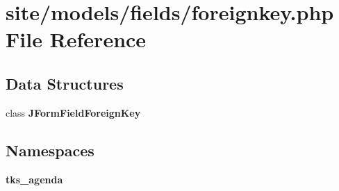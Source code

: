 \section{site/models/fields/foreignkey.php File Reference}
\label{site_2models_2fields_2foreignkey_8php}
\subsection*{Data Structures}
\begin{DoxyCompactItemize}
\item 
class \textbf{ J\+Form\+Field\+Foreign\+Key}
\end{DoxyCompactItemize}
\subsection*{Namespaces}
\begin{DoxyCompactItemize}
\item 
 \textbf{ tks\+\_\+agenda}
\end{DoxyCompactItemize}

